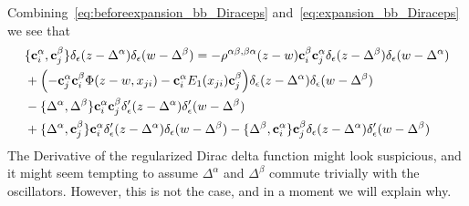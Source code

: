 Combining~\eqref{eq:beforeexpansion_bb_Diraceps} and~\eqref{eq:expansion_bb_Diraceps} we see that
\begin{equation}
\label{eq:afterexpansion_bb_Diracepsn}
\begin{split}
&\{\mathbf{c}_i^\alpha,\mathbf{c}_j^\beta\} \delta_\epsilon(z-\Delta^\alpha) \delta_\epsilon(w-\Delta^\beta)=-\rho^{\alpha \beta, \beta \alpha}(z-w)
\mathbf{c}_i^\beta \mathbf{c}_j^\alpha\delta_\epsilon(z-\Delta^\beta) \delta_\epsilon(w-\Delta^\alpha) \\
&+\Bigl(- \mathbf{c}_j^\alpha \mathbf{c}_i^\beta   \Phi(z-w, x_{ji})    - \mathbf{c}_i^\alpha E_1(x_{ji})    \mathbf{c}_j^\beta \Bigr) \delta_\epsilon(z-\Delta^\alpha) \delta_\epsilon(w-\Delta^\beta) \\
&-\{\Delta^\alpha,\Delta^\beta\} \mathbf{c}_i^\alpha \mathbf{c}_j^\beta \delta'_\epsilon(z-\Delta^\alpha) \delta'_\epsilon(w-\Delta^\beta)\\
&+\{\Delta^\alpha ,\mathbf{c}_j^\beta\} \mathbf{c}_i^\alpha \delta'_\epsilon(z-\Delta^\alpha) \delta_\epsilon(w-\Delta^\beta)-\{\Delta^\beta ,\mathbf{c}_i^\alpha\} \mathbf{c}_j^\beta \delta_\epsilon(z-\Delta^\alpha) \delta'_\epsilon(w-\Delta^\beta)
\end{split}
\end{equation}
The Derivative of the regularized Dirac delta function might look suspicious, and it might seem tempting to assume $\Delta^\alpha$ and $\Delta^\beta$ commute trivially with the oscillators.
However, this is not the case, and in a moment we will explain why.

